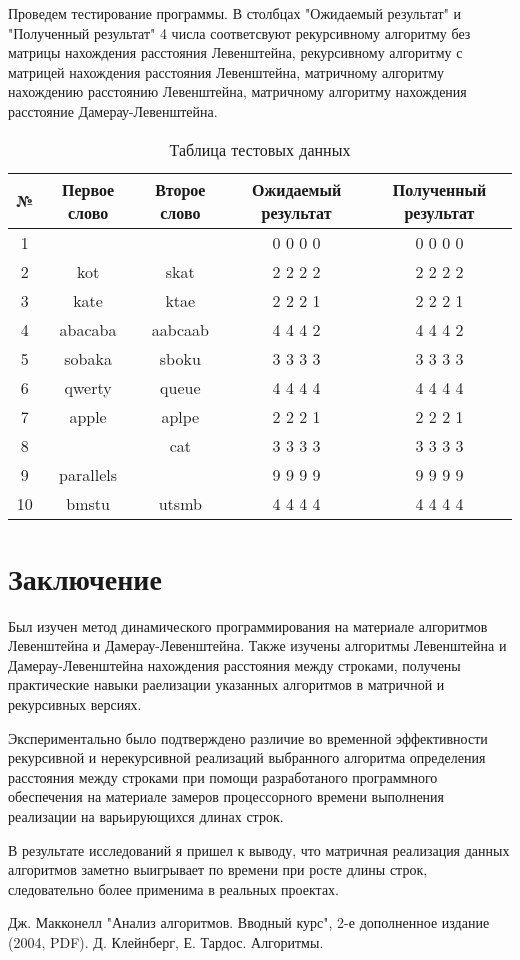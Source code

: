 \documentclass[12pt]{report}
\begin{document}
\par
Проведем тестирование программы. В столбцах "Ожидаемый результат" и "Полученный результат" 4 числа соответсвуют рекурсивному алгоритму без матрицы нахождения расстояния Левенштейна, рекурсивному алгоритму с матрицей нахождения расстояния Левенштейна, матричному алгоритму нахождению расстоянию Левенштейна, матричному алгоритму нахождения расстояние Дамерау-Левенштейна.

\begin{table} [h!]
\caption{Таблица тестовых данных}
	\begin{tabular}{|c c c c c|} 
 	\hline
	№ & Первое слово & Второе слово & Ожидаемый результат & Полученный результат \\ [0.8ex] 
 	\hline\hline
 	1 &  &  & 0 0 0 0 & 0 0 0 0\\
 	\hline
 	2 & kot & skat & 2 2 2 2 & 2 2 2 2\\
 	\hline
	3 & kate & ktae & 2 2 2 1 & 2 2 2 1\\
	\hline
	4 & abacaba & aabcaab & 4 4 4 2 & 4 4 4 2\\
	\hline
	5 & sobaka & sboku & 3 3 3 3 & 3 3 3 3\\
	\hline
	6 & qwerty & queue & 4 4 4 4 & 4 4 4 4\\
	\hline
	7 & apple & aplpe & 2 2 2 1  & 2 2 2 1\\
	\hline
	8 &  & cat & 3 3 3 3 & 3 3 3 3\\
	\hline
	9 & parallels &  & 9 9 9 9 & 9 9 9 9\\
	\hline
	10 & bmstu & utsmb & 4 4 4 4 & 4 4 4 4\\
	\hline
	\end{tabular}
\end{table}



\chapter*{Заключение}
Был изучен метод динамического программирования на материале алгоритмов Левенштейна и Дамерау-Левенштейна.
Также изучены алгоритмы Левенштейна и Дамерау-Левенштейна нахождения расстояния между строками, получены практические навыки раелизации указанных алгоритмов
в матричной  и рекурсивных версиях. 

Экспериментально было подтверждено различие во временной эффективности рекурсивной и нерекурсивной реализаций выбранного алгоритма определения расстояния между строками при помощи разработаного программного обеспечения на материале замеров процессорного времени выполнения реализации на варьирующихся длинах строк. 

В результате исследований я пришел к выводу, что матричная реализация данных алгоритмов заметно выигрывает по времени при росте длины строк, следовательно более применима в реальных проектах.

\begin{thebibliography}{3}
Дж. Макконелл "Анализ алгоритмов. Вводный курс", 2-е дополненное издание (2004, PDF).
Д. Клейнберг, Е. Тардос. Алгоритмы.
\end{thebibliography}
\end{document}
